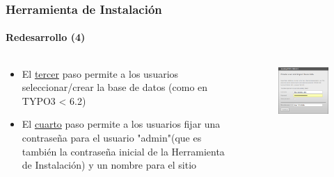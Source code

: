 
\begin{frame}[fragile]
	\frametitle{Herramienta de Instalación}
	\framesubtitle{Redesarrollo (4)}

	\begin{columns}[T]

		\begin{column}{.5\textwidth}
			\begin{itemize}
				\item El \underline{tercer} paso permite a los usuarios seleccionar/crear la base de datos\newline
					(como en TYPO3 < 6.2)
				\item El \underline{cuarto} paso permite a los usuarios fijar una contraseña para el usuario "admin"\newline (que es también la contraseña inicial de la Herramienta de Instalación) y un nombre para el sitio
			\end{itemize}
		\end{column}

		\begin{column}{.5\textwidth}
			\begin{figure}\vspace*{-0.4cm}
				\includegraphics[width=0.8\linewidth]{Images/InstallTool/AdminPasswordAndSiteName.png}
			\end{figure}
		\end{column}

	\end{columns}

\end{frame}

